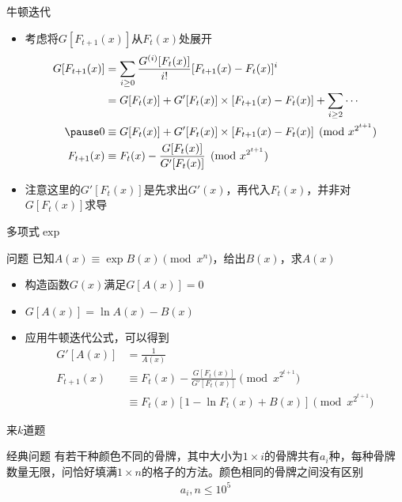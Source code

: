 \documentclass{beamer}
\begin{document}
\begin{frame}{牛顿迭代}
    \begin{itemize}
        \item 考虑将$G[F_{t+1}(x)]$从$F_t(x)$处展开 \pause
        $$\begin{aligned}
            G[F_{t+1}(x)]&=\sum_{i\geq 0}\frac{G^{(i)}[F_t(x)]}{i!}[F_{t+1}(x)-F_t(x)]^i\\ 
            &= G[F_t(x)] + G'[F_t(x)]\times [F_{t+1}(x) - F_t(x)] + \sum_{i\geq 2}\cdots\\  \pause
            0&\equiv G[F_t(x)] + G'[F_t(x)]\times [F_{t+1}(x) - F_t(x)]\pmod {x^{2^{t+1}}}\\ 
            F_{t+1}(x)&\equiv F_t(x) - \frac{G[F_t(x)]}{G'[F_t(x)]}\pmod {x^{2^{t + 1}}}
        \end{aligned}$$ \pause
        \item 注意这里的$G'[F_t(x)]$是先求出$G'(x)$，再代入$F_t(x)$，并非对$G[F_t(x)]$求导
    \end{itemize}
\end{frame}

\begin{frame}{多项式$\exp$}
    \begin{block}{问题}
        已知$A(x)\equiv \exp B(x) \pmod {x^n}$，给出$B(x)$，求$A(x)$
    \end{block} \pause
    \begin{itemize}
        \item 构造函数$G(x)$满足$G[A(x)] = 0$ \pause
        \item $G[A(x)] = \ln A(x) - B(x)$ \pause
        \item 应用牛顿迭代公式，可以得到 \pause
        $$\begin{aligned}
            G'[A(x)] &= \frac{1}{A(x)}\\
            F_{t+1}(x) &\equiv F_t(x) - \frac{G[F_t(x)]}{G'[F_t(x)]}\pmod {x^{2^{t + 1}}}\\
            &\equiv F_t(x)[1 - \ln F_t(x) + B(x)]\pmod {x^{2^{t + 1}}}
        \end{aligned}$$
    \end{itemize}
\end{frame}

\begin{frame}{来$k$道题}
    \begin{block}{经典问题}
        有若干种颜色不同的骨牌，其中大小为$1\times i$的骨牌共有$a_i$种，每种骨牌数量无限，问恰好填满$1\times n$的格子的方法。颜色相同的骨牌之间没有区别
        $$\begin{aligned}
            a_i, n\leq 10^5
        \end{aligned}$$
    \end{block}
\end{frame}
\end{document}
